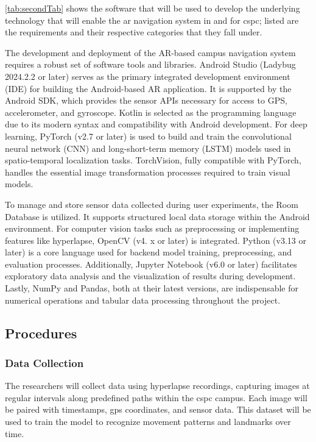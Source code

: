 \begin{refsection}
\ref{tab:secondTab} shows the software that will be used to develop the underlying technology that will enable the \gls{ar} navigation system in and for \gls{cspc}; listed are the requirements and their respective categories that they fall under.

The development and deployment of the AR-based campus navigation system requires a robust set of software tools and libraries. Android Studio (Ladybug 2024.2.2 or later) serves as the primary integrated development environment (IDE) for building the Android-based AR application. It is supported by the Android SDK, which provides the sensor APIs necessary for access to GPS, accelerometer, and gyroscope. Kotlin is selected as the programming language due to its modern syntax and compatibility with Android development. For deep learning, PyTorch (v2.7 or later) is used to build and train the convolutional neural network (CNN) and long-short-term memory (LSTM) models used in spatio-temporal localization tasks. TorchVision, fully compatible with PyTorch, handles the essential image transformation processes required to train visual models.

To manage and store sensor data collected during user experiments, the Room Database is utilized. It supports structured local data storage within the Android environment. For computer vision tasks such as preprocessing or implementing features like hyperlapse, OpenCV (v4. x or later) is integrated. Python (v3.13 or later) is a core language used for backend model training, preprocessing, and evaluation processes. Additionally, Jupyter Notebook (v6.0 or later) facilitates exploratory data analysis and the visualization of results during development. Lastly, NumPy and Pandas, both at their latest versions, are indispensable for numerical operations and tabular data processing throughout the project.

\subsection{Procedures}

\subsubsection{Data Collection}

The researchers will collect data using hyperlapse recordings, capturing images at regular intervals along predefined paths within the \gls{cspc} campus. Each image will be paired with timestamps, \gls{gps} coordinates, and sensor data. This dataset will be used to train the model to recognize movement patterns and landmarks over time.


\end{refsection}

